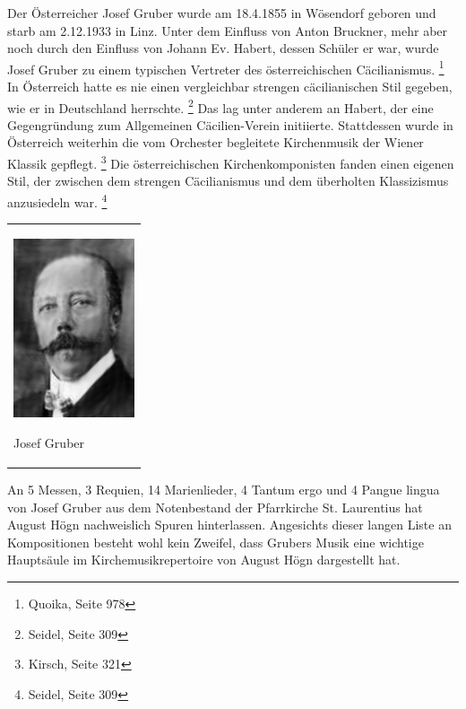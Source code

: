 Der Österreicher Josef Gruber wurde am 18.4.1855 in Wösendorf geboren
und starb am 2.12.1933 in Linz. Unter dem Einfluss von Anton Bruckner,
mehr aber noch durch den Einfluss von Johann Ev. Habert, dessen Schüler
er war, wurde Josef Gruber zu einem typischen Vertreter des
österreichischen Cäcilianismus. \footnote{Quoika, Seite 978} In
Österreich hatte es nie einen vergleichbar strengen cäcilianischen Stil
gegeben, wie er in Deutschland herrschte. \footnote{Seidel, Seite 309}
Das lag unter anderem an Habert, der eine Gegengründung zum Allgemeinen
Cäcilien-Verein initiierte. Stattdessen wurde in Österreich weiterhin
die vom Orchester begleitete Kirchenmusik der Wiener Klassik
gepflegt. \footnote{Kirsch, Seite 321} Die österreichischen
Kirchenkomponisten fanden einen eigenen Stil, der zwischen dem strengen
Cäcilianismus und dem überholten Klassizismus anzusiedeln
war. \footnote{Seidel, Seite 309}

\begin{center}
\begin{minipage}{3.953cm}
\begin{flushleft}
\tablefirsthead{}
\tablehead{}
\tabletail{}
\tablelasttail{}
\begin{supertabular}{m{3.753cm}}

\includegraphics[width=3.57cm,height=5.276cm]{pictures/zulassungsarbeit-img093.jpg}

Josef Gruber\\
\end{supertabular}
\end{flushleft}
\end{minipage}
\end{center}
An 5 Messen, 3 Requien, 14 Marienlieder, 4 Tantum ergo und 4 Pangue
lingua von Josef Gruber aus dem Notenbestand der Pfarrkirche St.
Laurentius hat August Högn nachweislich Spuren hinterlassen. Angesichts
dieser langen Liste an Kompositionen besteht wohl kein Zweifel, dass
Grubers Musik eine wichtige Hauptsäule im Kirchemusikrepertoire von
August Högn dargestellt hat.

